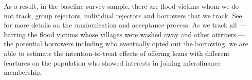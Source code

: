 	As a result, in the baseline survey sample, there are flood victims whom we do not track, group rejectors, individual rejectors and borrowers that we track. See \citet{GUK2016} for more details on the randomisation and acceptance process. As we track all --- barring the flood victims whose villages were washed away and other attriters --- the potential borrowers including who eventually opted out the borrowing, we are able to estimate the intention-to-treat effects of offering loans with different feartures on the population who showed interests in joining microfinance membership. 


